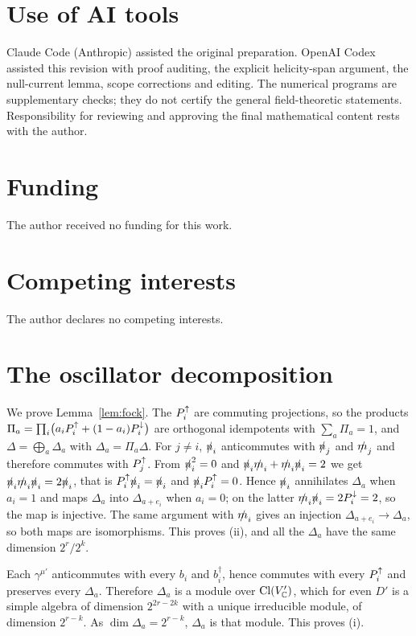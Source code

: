 \section*{Use of AI tools}

Claude Code (Anthropic) assisted the original preparation. OpenAI Codex assisted this revision with proof auditing, the explicit helicity-span argument, the null-current lemma, scope corrections and editing. The numerical programs are supplementary checks; they do not certify the general field-theoretic statements. Responsibility for reviewing and approving the final mathematical content rests with the author.

\section*{Funding}

The author received no funding for this work.

\section*{Competing interests}

The author declares no competing interests.

\appendix

\section{The oscillator decomposition}
\label{app:fock}

We prove Lemma~\ref{lem:fock}. The $P^{\uparrow}_i$ are commuting projections, so the products $\Pi_a=\prod_i\bigl(a_iP^{\uparrow}_i+(1-a_i)P^{\downarrow}_i\bigr)$ are orthogonal idempotents with $\sum_a\Pi_a=1$, and $\Delta=\bigoplus_a\Delta_a$ with $\Delta_a=\Pi_a\Delta$. For $j\ne i$, $\slashed{n}_i$ anticommutes with $\slashed{n}_j$ and $\slashed{m}_j$ and therefore commutes with $P^{\uparrow}_j$. From $\slashed{n}_i^2=0$ and $\slashed{n}_i\slashed{m}_i+\slashed{m}_i\slashed{n}_i=2$ we get $\slashed{n}_i\slashed{m}_i\slashed{n}_i=2\slashed{n}_i$, that is $P^{\uparrow}_i\slashed{n}_i=\slashed{n}_i$ and $\slashed{n}_iP^{\uparrow}_i=0$. Hence $\slashed{n}_i$ annihilates $\Delta_a$ when $a_i=1$ and maps $\Delta_a$ into $\Delta_{a+e_i}$ when $a_i=0$; on the latter $\slashed{m}_i\slashed{n}_i=2P^{\downarrow}_i=2$, so the map is injective. The same argument with $\slashed{m}_i$ gives an injection $\Delta_{a+e_i}\to\Delta_a$, so both maps are isomorphisms. This proves (ii), and all the $\Delta_a$ have the same dimension $2^r/2^k$.

Each $\gamma^{\mu'}$ anticommutes with every $b_i$ and $b_i^\dagger$, hence commutes with every $P^{\uparrow}_i$ and preserves every $\Delta_a$. Therefore $\Delta_a$ is a module over $\operatorname{Cl}(V'_{\mathbb{C}})$, which for even $D'$ is a simple algebra of dimension $2^{2r-2k}$ with a unique irreducible module, of dimension $2^{r-k}$. As $\dim\Delta_a=2^{r-k}$, $\Delta_a$ is that module. This proves (i).

